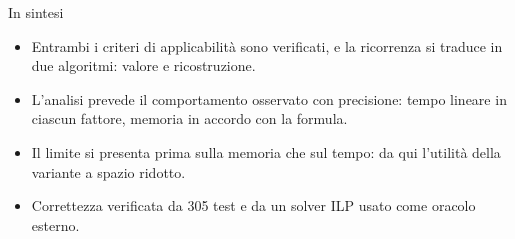 \documentclass[aspectratio=169,11pt]{beamer}
\begin{document}
\begin{frame}{In sintesi}
  \begin{itemize}
    \item Entrambi i criteri di applicabilit\`a sono verificati, e la ricorrenza
          si traduce in due algoritmi: valore e ricostruzione.
    \item L'analisi prevede il comportamento osservato con precisione: tempo
          lineare in ciascun fattore, memoria in accordo con la formula.
    \item Il limite si presenta prima sulla memoria che sul tempo: da qui
          l'utilit\`a della variante a spazio ridotto.
    \item Correttezza verificata da 305 test e da un solver ILP usato come
          oracolo esterno.
  \end{itemize}
  \vfill
\end{frame}
\end{document}
